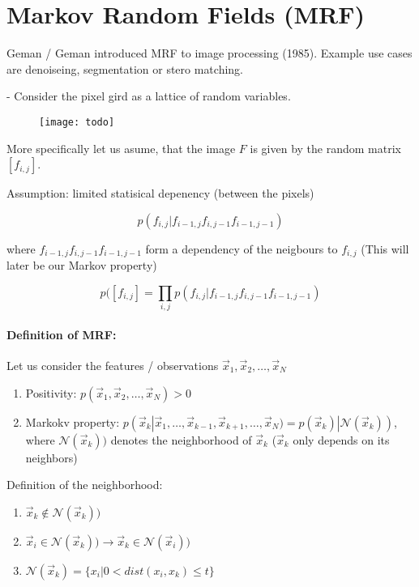 
\section*{Markov Random Fields (MRF)}

Geman / Geman introduced MRF to image processing (1985). Example use cases are denoiseing, segmentation or stero matching.

- Consider the pixel gird as a lattice of random variables.

\begin{figure}[H]
	\centering
	\texttt{[image: todo]}
\end{figure}

More specifically let us asume, that the image $F$ is given by the random matrix $[f_{i,j}]$.

Assumption: limited statisical depenency (between the pixels)

\begin{equation*}
    p(f_{i, j} | f_{i-1, j} f_{i, j-1} f_{i-1, j-1})
\end{equation*}

where $f_{i-1, j} f_{i, j-1} f_{i-1, j-1}$ form a dependency of the neigbours to $f_{i,j}$ (This will later be our Markov property)

\begin{equation*}
    p([f_{i, j}] = \prod_{i,j} p(f_{i, j} | f_{i-1, j} f_{i, j-1} f_{i-1, j-1})
\end{equation*}

\paragraph{Definition of MRF:\\}

Let us consider the features / observations $\vec{x}_1, \vec{x}_2, \dots, \vec{x}_N$
\begin{enumerate}
    \item Positivity: $ p(\vec{x}_1, \vec{x}_2, \dots, \vec{x}_N) > 0$
    \item Markokv property: $ p(\vec{x}_k |\vec{x}_1, \dots, \vec{x}_{k-1}, \vec{x}_{k+1}, \dots, \vec{x}_N) = p(\vec{x}_k) | \mathcal{N}(\vec{x}_k)) $, where $\mathcal{N}(\vec{x}_k))$ denotes the neighborhood of $\vec{x}_k$ ($\vec{x}_k$ only depends on its neighbors)
\end{enumerate}

Definition of the neighborhood:
\begin{enumerate}
	\item $\vec{x}_k \notin \mathcal{N}(\vec{x}_k))$
	\item $\vec{x}_i \in \mathcal{N}(\vec{x}_k)) \rightarrow \vec{x}_k \in \mathcal{N}(\vec{x}_i))$
	\item $\mathcal{N}(\vec{x}_k) = \{x_i|0 < dist(x_i, x_k) \le t\}$
\end{enumerate}


